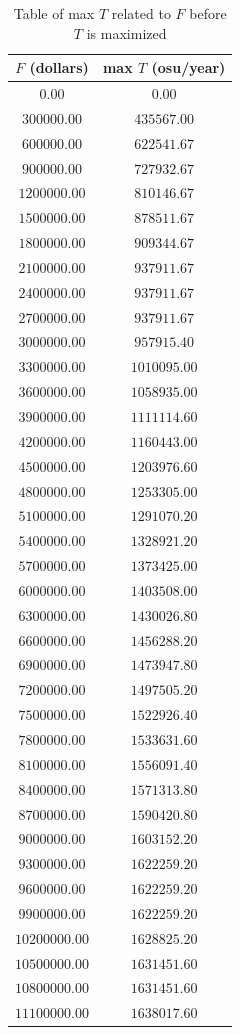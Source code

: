 \documentclass{article}
\begin{document}
\begin{appendices}
\begin{longtable}{cc}
\caption{Table of max $T$ related to $F$ before $T$ is maximized}
\label{tab:max T funds}\\
\toprule
$F$ (dollars) & max $T$ (osu/year)\\
\midrule
$0.00$ & $0.00$\\
$300000.00$ & $435567.00$\\
$600000.00$ & $622541.67$\\
$900000.00$ & $727932.67$\\
$1200000.00$ & $810146.67$\\
$1500000.00$ & $878511.67$\\
$1800000.00$ & $909344.67$\\
$2100000.00$ & $937911.67$\\
$2400000.00$ & $937911.67$\\
$2700000.00$ & $937911.67$\\
$3000000.00$ & $957915.40$\\
$3300000.00$ & $1010095.00$\\
$3600000.00$ & $1058935.00$\\
$3900000.00$ & $1111114.60$\\
$4200000.00$ & $1160443.00$\\
$4500000.00$ & $1203976.60$\\
$4800000.00$ & $1253305.00$\\
$5100000.00$ & $1291070.20$\\
$5400000.00$ & $1328921.20$\\
$5700000.00$ & $1373425.00$\\
$6000000.00$ & $1403508.00$\\
$6300000.00$ & $1430026.80$\\
$6600000.00$ & $1456288.20$\\
$6900000.00$ & $1473947.80$\\
$7200000.00$ & $1497505.20$\\
$7500000.00$ & $1522926.40$\\
$7800000.00$ & $1533631.60$\\
$8100000.00$ & $1556091.40$\\
$8400000.00$ & $1571313.80$\\
$8700000.00$ & $1590420.80$\\
$9000000.00$ & $1603152.20$\\
$9300000.00$ & $1622259.20$\\
$9600000.00$ & $1622259.20$\\
$9900000.00$ & $1622259.20$\\
$10200000.00$ & $1628825.20$\\
$10500000.00$ & $1631451.60$\\
$10800000.00$ & $1631451.60$\\
$11100000.00$ & $1638017.60$\\
\bottomrule
\end{longtable}

\end{appendices}

\newpage



\end{document}
